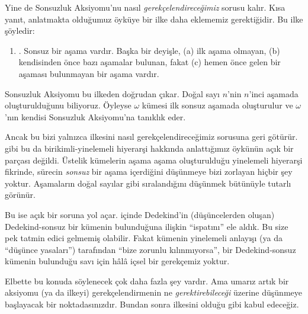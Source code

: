 \documentclass[../../../include/open-logic-section]{subfiles}
\begin{document}
Yine de Sonsuzluk Aksiyomu'nu nasıl \emph{gerekçelendireceğimiz} sorusu
kalır. Kısa yanıt, anlatmakta olduğumuz öyküye bir ilke daha eklememiz
gerektiğidir. Bu ilke şöyledir:
\begin{enumerate}
	\item[] \stagesinf. Sonsuz bir aşama vardır. Başka bir deyişle,
	(a) ilk aşama olmayan, (b) kendisinden önce bazı aşamalar bulunan, fakat
	(c) hemen önce gelen bir aşaması bulunmayan bir aşama vardır.
\end{enumerate}
Sonsuzluk Aksiyomu bu ilkeden doğrudan çıkar. Doğal sayı $n$'nin $n$'inci
aşamada oluşturulduğunu biliyoruz. Öyleyse $\omega$ kümesi ilk sonsuz
aşamada oluşturulur ve $\omega$'nın kendisi Sonsuzluk Aksiyomu'na tanıklık
eder.

Ancak bu bizi yalnızca \stagesinf{} ilkesini nasıl gerekçelendireceğimiz
sorusuna geri götürür. \stagessucc{} gibi bu da birikimli-yinelemeli
hiyerarşi hakkında anlattığımız öykünün açık bir parçası değildi. Üstelik
kümelerin aşama aşama oluşturulduğu yinelemeli hiyerarşi fikrinde, sürecin
\emph{sonsuz} bir aşama içerdiğini düşünmeye bizi zorlayan hiçbir şey
yoktur. Aşamaların doğal sayılar gibi sıralandığını düşünmek bütünüyle
tutarlı görünür.

Bu ise açık bir soruna yol açar. 
içinde Dedekind'in (düşüncelerden oluşan) Dedekind-sonsuz bir kümenin
bulunduğuna ilişkin ``ispatını'' ele aldık. Bu size pek tatmin edici
gelmemiş olabilir. Fakat \stagesinf{} kümenin yinelemeli anlayışı (ya da
``düşünce yasaları'') tarafından ``bize zorunlu kılınmıyorsa'', bir
Dedekind-sonsuz kümenin bulunduğu savı için hâlâ içsel bir gerekçemiz yoktur.

Elbette bu konuda söylenecek çok daha fazla şey vardır. Ama umarız artık
bir aksiyomu (ya da ilkeyi) gerekçelendirmenin ne \emph{gerektirebileceği}
üzerine düşünmeye başlayacak bir noktadasınızdır. Bundan sonra
\stagesinf{} ilkesini olduğu gibi kabul edeceğiz.
\end{document}
